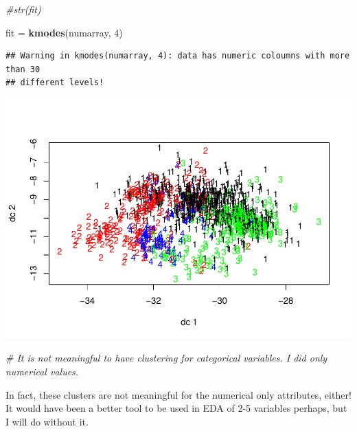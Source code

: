 \documentclass[]{article}
\newenvironment{Shaded}{\begin{snugshade}}{\end{snugshade}}
\newcommand{\KeywordTok}[1]{\textcolor[rgb]{0.13,0.29,0.53}{\textbf{#1}}}
\newcommand{\DecValTok}[1]{\textcolor[rgb]{0.00,0.00,0.81}{#1}}
\newcommand{\StringTok}[1]{\textcolor[rgb]{0.31,0.60,0.02}{#1}}
\newcommand{\CommentTok}[1]{\textcolor[rgb]{0.56,0.35,0.01}{\textit{#1}}}
\newcommand{\OperatorTok}[1]{\textcolor[rgb]{0.81,0.36,0.00}{\textbf{#1}}}
\newcommand{\NormalTok}[1]{#1}
\begin{document}
\begin{Shaded}
\begin{Highlighting}[]
\CommentTok{#str(fit)}

\NormalTok{fit =}\StringTok{ }\KeywordTok{kmodes}\NormalTok{(numarray, }\DecValTok{4}\NormalTok{)}
\end{Highlighting}
\end{Shaded}

\begin{verbatim}
## Warning in kmodes(numarray, 4): data has numeric coloumns with more than 30
## different levels!
\end{verbatim}

\begin{Shaded}
\end{Shaded}

\includegraphics{EDA_files/figure-latex/unnamed-chunk-117-2.pdf}

\begin{Shaded}
\begin{Highlighting}[]
\CommentTok{# It is not meaningful to have clustering for categorical variables. I did only numerical values.}
\end{Highlighting}
\end{Shaded}

In fact, these clusters are not meaningful for the numerical only
attributes, either! It would have been a better tool to be used in EDA
of 2-5 variables perhaps, but I will do without it.
\end{document}
